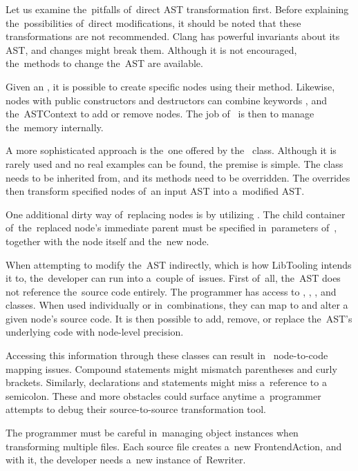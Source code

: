 Let us examine the~pitfalls of~direct AST transformation first. 
Before explaining the~possibilities of~direct modifications, it 
should be noted that these transformations are not recommended. 
Clang has powerful invariants about its AST, and changes might 
break them. 
Although it is not encouraged, the~methods to change the~AST 
are available.

Given an , it is possible to create specific nodes
using their  method. 
Likewise, nodes with public constructors and destructors can combine 
keywords ,  and the~ASTContext 
to add or remove nodes. 
The job of~ is then to manage the~memory internally.

A more sophisticated approach is the~one offered 
by the~ class. 
Although it is rarely used and no real examples can be found, 
the premise is simple. 
The  class needs to be inherited from, 
and its  methods need to be overridden. 
The overrides then transform specified nodes of~an input AST 
into a~modified AST.

One additional dirty way of~replacing nodes is by utilizing 
. 
The child container of~the~replaced node's immediate parent must be 
specified in~parameters of~, together with 
the node itself and the~new node.

When attempting to modify the~AST indirectly, which is how LibTooling 
intends it to, the~developer can run into a~couple of~issues. 
First of~all, the~AST does not reference the~source code entirely. 
The programmer has access to , ,
, and  classes. 
When used individually or in~combinations, they can map to and alter 
a given node's source code.
It is then possible to add, remove, or replace the~AST's underlying 
code with node-level precision.

Accessing this information through these classes can result in~
node-to-code mapping issues. 
Compound statements might mismatch parentheses and curly brackets. 
Similarly, declarations and statements might miss a~reference to 
a semicolon. 
These and more obstacles could surface anytime a~programmer attempts 
to debug their source-to-source transformation tool. 

The programmer must be careful in~managing object instances when 
transforming multiple files. 
Each source file creates a~new FrontendAction, and with it, 
the developer needs a~new instance of~Rewriter.

